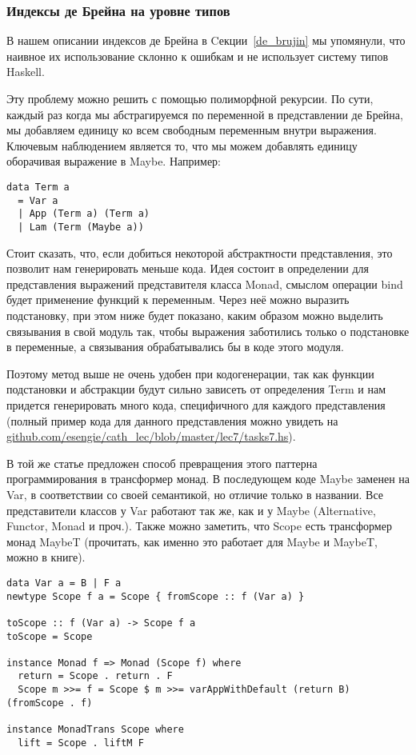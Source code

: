 \subsubsection{Индексы де Брейна на уровне типов}\label{de_brujin_impl}
В нашем описании индексов де Брейна в Cекции~\ref{de_brujin} мы упомянули, что наивное их использование склонно к ошибкам и не использует систему типов Haskell.

Эту проблему можно решить с помощью полиморфной рекурсии\cite{Bird:Pat}. По сути, каждый раз когда мы абстрагируемся по переменной в представлении де Брейна, мы добавляем единицу ко всем свободным переменным внутри выражения. Ключевым наблюдением является то, что мы можем добавлять единицу оборачивая выражение в Maybe. Например:

\begin{lstlisting}[frame=single]
data Term a
  = Var a
  | App (Term a) (Term a)
  | Lam (Term (Maybe a))
\end{lstlisting}

Стоит сказать, что, если добиться некоторой абстрактности представления, это позволит нам генерировать меньше кода. Идея состоит в определении для представления выражений представителя класса Monad, смыслом операции bind будет применение функций к переменным. Через неё можно выразить подстановку, при этом ниже будет показано, каким образом можно выделить связывания в свой модуль так, чтобы выражения заботились только о подстановке в переменные, а связывания обрабатывались бы в коде этого модуля.

Поэтому метод выше не очень удобен при кодогенерации, так как функции подстановки и абстракции будут сильно зависеть от определения Term и нам придется генерировать много кода, специфичного для каждого представления (полный пример кода для данного представления можно увидеть на \url{github.com/esengie/cath_lec/blob/master/lec7/tasks7.hs}).

В той же статье\cite{Bird:Pat} предложен способ превращения этого паттерна программирования в трансформер монад. В последующем коде Maybe заменен на Var, в соответствии со своей семантикой, но отличие только в названии. Все представители классов у Var работают так же, как и у Maybe (Alternative, Functor, Monad и проч.). Также можно заметить, что Scope есть трансформер монад MaybeT (прочитать, как именно это работает для Maybe и MaybeT, можно в книге\cite{moronuki}).

\begin{lstlisting}[frame=single]
data Var a = B | F a
newtype Scope f a = Scope { fromScope :: f (Var a) }

toScope :: f (Var a) -> Scope f a
toScope = Scope

instance Monad f => Monad (Scope f) where
  return = Scope . return . F
  Scope m >>= f = Scope $ m >>= varAppWithDefault (return B) (fromScope . f)

instance MonadTrans Scope where
  lift = Scope . liftM F
\end{lstlisting}

